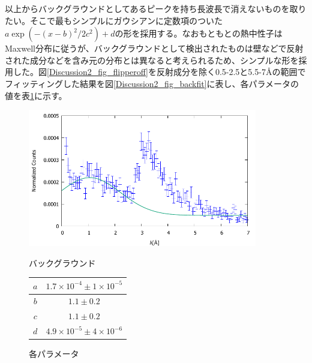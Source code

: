 以上からバックグラウンドとしてあるピークを持ち長波長で消えないものを取りたい。そこで最もシンプルにガウシアンに定数項のついた$a\exp(-(x-b)^2/2c^2)+d$の形を採用する。なおもともとの熱中性子はMaxwell分布に従うが、バックグラウンドとして検出されたものは壁などで反射された成分などを含み元の分布とは異なると考えられるため、シンプルな形を採用した。図\ref{Discussion2_fig_flipperoff}を反射成分を除く0.5-2.5と5.5-7\AA の範囲でフィッティングした結果を図\ref{Discussion2_fig_backfit}に表し、各パラメータの値を表\ref{Discussion2_tbl_backfit}に示す。

\begin{figure}[H]
\begin{minipage}{0.7\hsize}
\centering
\includegraphics[width=10cm]{discussion/BG/background.pdf}
\caption{バックグラウンド} \label{Discussion2_fig_backfit}
\end{minipage}
\begin{minipage}{0.3\hsize}
\centering
\makeatletter
\def\@captype{table}
\makeatother
\caption{各パラメータ} \label{Discussion2_tbl_backfit}
\begin{tabular}{|c|c|} \hline
$a$&$1.7\times 10^{-4}\pm 1\times10^{-5}$\\ \hline
$b$&$1.1\pm0.2$\\ \hline
$c$&$1.1\pm0.2$\\ \hline
$d$&$4.9\times 10^{-5}\pm4\times 10^{-6}$\\ \hline
\end{tabular}
\end{minipage}
\end{figure}

